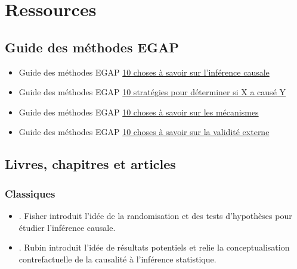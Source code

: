 \documentclass[12pt,]{book}
\begin{document}
\hypertarget{ressources-1}{%
\section{Ressources}\label{ressources-1}}

\hypertarget{guide-des-muxe9thodes-egap-1}{%
\subsection{Guide des méthodes EGAP}\label{guide-des-muxe9thodes-egap-1}}

\begin{itemize}
\item
  Guide des méthodes EGAP \href{https://egap.org/resource/10-things-to-know-about-causal-inference/}{10 choses à savoir sur l'inférence causale}
\item
  Guide des méthodes EGAP \href{https://egap.org/resource/10-strategies-figuring-out-if-x-caused-y/}{10 stratégies pour déterminer si X a causé Y}
\item
  Guide des méthodes EGAP \href{https://egap.org/resource/10-things-mechanisms/}{10 choses à savoir sur les mécanismes}
\item
  Guide des méthodes EGAP \href{https://egap.org/resource/10-things-to-know-about-external-validity/}{10 choses à savoir sur la validité externe}
\end{itemize}

\hypertarget{causalinference-cites}{%
\subsection{Livres, chapitres et articles}\label{causalinference-cites}}

\hypertarget{causalinference-classics}{%
\subsubsection{Classiques}\label{causalinference-classics}}

\begin{itemize}
\item
  \autocite{fisher_design_1935}. Fisher introduit l'idée de la randomisation et des tests d'hypothèses pour étudier l'inférence causale.
\item
  \autocite{rubin:1974}. Rubin introduit l'idée de résultats potentiels et relie la conceptualisation contrefactuelle de la causalité à l'inférence statistique.
\end{itemize}
\end{document}
